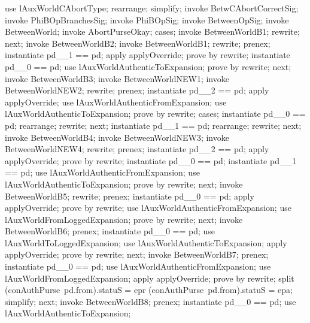 \begin{LPScript}\begin{zproof}[lBetweenWorldCAbortType]
    use lAuxWorldCAbortType;
    rearrange;
    simplify;
    invoke BetwCAbortCorrectSig;
    invoke PhiBOpBranchesSig;
    invoke PhiBOpSig;
    invoke BetweenOpSig;
    invoke BetweenWorld;
    invoke AbortPurseOkay;
    cases;
        invoke BetweenWorldB1;
        rewrite;
    next;
        invoke BetweenWorldB2;
        invoke BetweenWorldB1;
        rewrite;
        prenex;
        instantiate pd\_\_1 == pd;
        apply applyOverride;
        prove by rewrite;
        instantiate pd\_\_0 == pd;
        use lAuxWorldAuthenticToExpansion;
        prove by rewrite;
    next;
        invoke BetweenWorldB3;
        invoke BetweenWorldNEW1;
        invoke BetweenWorldNEW2;
        rewrite;
        prenex;
        instantiate pd\_\_2 == pd;
        apply applyOverride;
        use lAuxWorldAuthenticFromExpansion;
        use lAuxWorldAuthenticToExpansion;
        prove by rewrite;
        cases;
            instantiate pd\_\_0 == pd;
            rearrange;
            rewrite;
        next;
            instantiate pd\_\_1 == pd;
            rearrange;
            rewrite;
    next;
        invoke BetweenWorldB4;
        invoke BetweenWorldNEW3;
        invoke BetweenWorldNEW4;
        rewrite;
        prenex;
        instantiate pd\_\_2 == pd;
        apply applyOverride;
        prove by rewrite;
        instantiate pd\_\_0 == pd;
        instantiate pd\_\_1 == pd;
        use lAuxWorldAuthenticFromExpansion;
        use lAuxWorldAuthenticToExpansion;
        prove by rewrite;
    next;
        invoke BetweenWorldB5;
        rewrite;
        prenex;
        instantiate pd\_\_0 == pd;
        apply applyOverride;
        prove by rewrite;
        use lAuxWorldAuthenticFromExpansion;
        use lAuxWorldFromLoggedExpansion;
        prove by rewrite;
    next;
        invoke BetweenWorldB6;
        prenex;
        instantiate pd\_\_0 == pd;
        use lAuxWorldToLoggedExpansion;
        use lAuxWorldAuthenticToExpansion;
        apply applyOverride;
        prove by rewrite;
    next;
        invoke BetweenWorldB7;
        prenex;
        instantiate pd\_\_0 == pd;
        use lAuxWorldAuthenticFromExpansion;
        use lAuxWorldFromLoggedExpansion;
        apply applyOverride;
        prove by rewrite;
        split (conAuthPurse~pd.from).statuS = epr
            \lor (conAuthPurse~pd.from).statuS = epa;
        simplify;
    next;
        invoke BetweenWorldB8;
        prenex;
        instantiate pd\_\_0 == pd;
        use lAuxWorldAuthenticToExpansion;

\end{zproof}
\end{LPScript}

